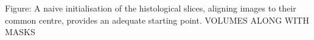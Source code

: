     Figure: A naive initialisation of the histological slices, aligning images to their common centre, provides an adequate starting point. VOLUMES ALONG WITH MASKS
    
    \begin{figure}[htbp]
      \centering

\end{figure}
